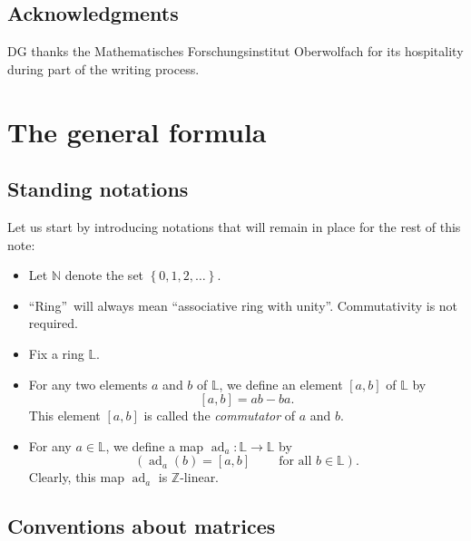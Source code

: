 \documentclass[numbers=enddot,12pt,final,onecolumn,notitlepage]{scrartcl}%
\theoremstyle{definition}
\begin{document}
\subsection*{Acknowledgments}

DG thanks the Mathematisches Forschungsinstitut Oberwolfach for its
hospitality during part of the writing process.

\section{\label{sect.form}The general formula}

\subsection{\label{subsect.form.standing-not}Standing notations}

Let us start by introducing notations that will remain in place for the rest
of this note:

\begin{itemize}
\item Let $\mathbb{N}$ denote the set $\left\{  0,1,2,\ldots\right\}  $.

\item \textquotedblleft Ring\textquotedblright\ will always mean
\textquotedblleft associative ring with unity\textquotedblright. Commutativity
is not required.

\item Fix a ring $\mathbb{L}$.

\item For any two elements $a$ and $b$ of $\mathbb{L}$, we define an element
$\left[  a,b\right]  $ of $\mathbb{L}$ by%
\[
\left[  a,b\right]  =ab-ba.
\]
This element $\left[  a,b\right]  $ is called the \textit{commutator} of $a$
and $b$.

\item For any $a\in\mathbb{L}$, we define a map $\operatorname*{ad}%
\nolimits_{a}:\mathbb{L}\rightarrow\mathbb{L}$ by
\[
\left(  \operatorname*{ad}\nolimits_{a}\left(  b\right)  =\left[  a,b\right]
\ \ \ \ \ \ \ \ \ \ \text{for all }b\in\mathbb{L}\right)  .
\]
Clearly, this map $\operatorname*{ad}\nolimits_{a}$ is $\mathbb{Z}$-linear.
\end{itemize}

\subsection{\label{subsect.form.matrices}Conventions about matrices}
\end{document}
